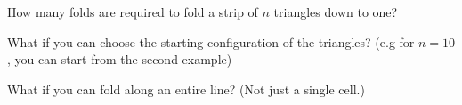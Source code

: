 \documentclass{article}
\begin{document}
\begin{question}
  How many folds are required to fold a strip of $n$ triangles down to one?
\end{question}
\begin{related}
  \item What if you can choose the starting configuration of the triangles?
    (e.g for $n=10$, you can start from the second example)
  \item What if you can fold along an entire line? (Not just a single cell.)
\end{related}
\end{document}
